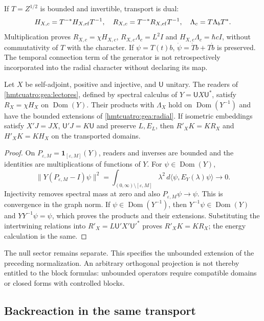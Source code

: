 If $T=Z^{1/2}$ is bounded and invertible, transport is dual:
\begin{equation}
H_{X,c}=T^{-*}H_{X,\rm ef}T^{-1},\quad
R_{X,c}=T^{-*}R_{X,\rm ef}T^{-1},\quad
\Lambda_c=T\Lambda_bT^*.
\label{hmtcuatro:gea:dual}
\end{equation}
Multiplication proves $R_{X,c}=\chi H_{X,c}$, $R_{X,c}\Lambda_c=L^2I$ and $H_{X,c}\Lambda_c=\hbar cI$, without commutativity of $T$ with the character. If $\psi=T(t)b$, $\dot\psi=\dot Tb+T\dot b$ is preserved. The temporal connection term of the generator is not retrospectively incorporated into the radial character without declaring its map.

\begin{proposition}
\label{hmtcuatro:gea:limite} Let $X$ be self-adjoint, positive and injective, and $\mathsf U$ unitary. The readers of \eqref{hmtcuatro:gea:lectores}, defined by spectral calculus of $Y=\mathsf UX\mathsf U^*$, satisfy $R_X=\chi H_X$ on $\operatorname{Dom}(Y)$. Their products with $\Lambda_X$ hold on $\operatorname{Dom}(Y^{-1})$ and have the bounded extensions of \eqref{hmtcuatro:gea:radial}. If isometric embeddings satisfy $X'J=JX$, $\mathsf U'J=K\mathsf U$ and preserve $L,E_L$, then $R'_XK=KR_X$ and $H'_XK=KH_X$ on the transported domains.
\end{proposition}
\begin{proof}
On $P_{\varepsilon,M}=\mathbf1_{[\varepsilon,M]}(Y)$, readers and inverses are bounded and the identities are multiplications of functions of $Y$. For $\psi\in\operatorname{Dom}(Y)$,
\[
\|Y(P_{\varepsilon,M}-I)\psi\|^2
=\int_{(0,\infty)\setminus[\varepsilon,M]}
\lambda^2\,d\langle\psi,E_Y(\lambda)\psi\rangle\longrightarrow0.
\]
Injectivity removes spectral mass at zero and also $P_{\varepsilon,M}\psi\to\psi$. This is convergence in the graph norm. If $\psi\in\operatorname{Dom}(Y^{-1})$, then $Y^{-1}\psi\in\operatorname{Dom}(Y)$ and $YY^{-1}\psi=\psi$, which proves the products and their extensions. Substituting the intertwining relations into $R'_X=L\mathsf U'X'\mathsf U'^*$ proves $R'_XK=KR_X$; the energy calculation is the same.
\end{proof}
The null sector remains separate. This specifies the unbounded extension of the preceding normalization. An arbitrary orthogonal projection is not thereby entitled to the block formulas: unbounded operators require compatible domains or closed forms with controlled blocks.

\subsection{Backreaction in the same transport}
\label{hmtcuatro:gea:retroaccion}

